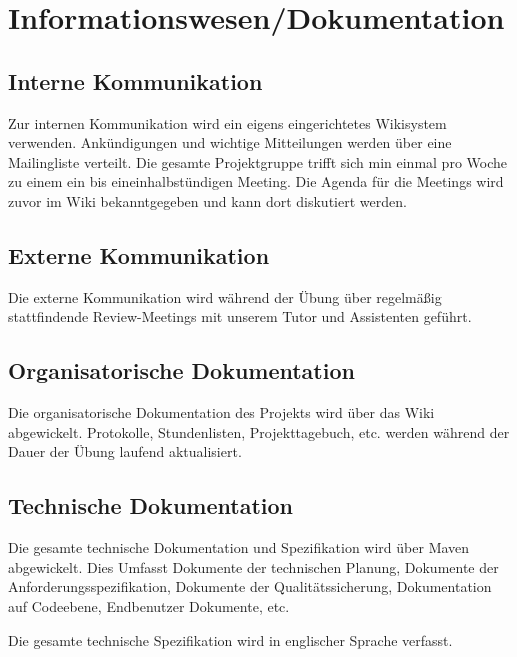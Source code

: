 

\section{Informationswesen/Dokumentation}
\subsection{Interne Kommunikation}
Zur internen Kommunikation wird ein eigens eingerichtetes Wikisystem verwenden. Ankündigungen und wichtige Mitteilungen werden über eine Mailingliste verteilt. Die gesamte Projektgruppe trifft sich min einmal pro Woche zu einem ein bis eineinhalbstündigen Meeting. Die Agenda für die Meetings wird zuvor im Wiki bekanntgegeben und kann dort diskutiert werden. 

\subsection{Externe Kommunikation}
Die externe Kommunikation wird während der Übung über regelmäßig stattfindende Review-Meetings mit unserem Tutor und Assistenten geführt. 

\subsection{Organisatorische Dokumentation}
Die organisatorische Dokumentation des Projekts wird über das Wiki abgewickelt. Protokolle, Stundenlisten, Projekttagebuch, etc. werden während der Dauer der Übung laufend aktualisiert.

\subsection{Technische Dokumentation}
Die gesamte technische Dokumentation und Spezifikation wird über Maven abgewickelt. Dies Umfasst Dokumente der technischen Planung, Dokumente der Anforderungsspezifikation, Dokumente der Qualitätssicherung, Dokumentation auf Codeebene, Endbenutzer Dokumente, etc.

Die gesamte technische Spezifikation wird in englischer Sprache verfasst.